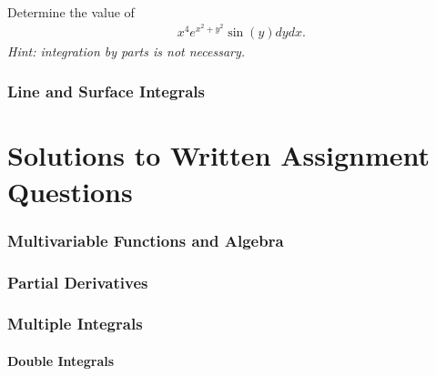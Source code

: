 \documentclass{article}
\begin{document}
\item %
\\
Determine the value of
\begin{align*}
  \mathop{\int_0^{\pi} \!\! \int_{-1}^1} x^4e^{x^2 + y^2}\sin(y) dydx.
\end{align*}
\textit{Hint: integration by parts is not necessary.}



\EEN %

\section{Line and Surface Integrals}
\part{Solutions to Written Assignment Questions}
\setcounter{section}{0}
\section{Multivariable Functions and Algebra}
\section{Partial Derivatives}
\section{Multiple Integrals}
\newpage

\subsection{Double Integrals}
\end{document}
